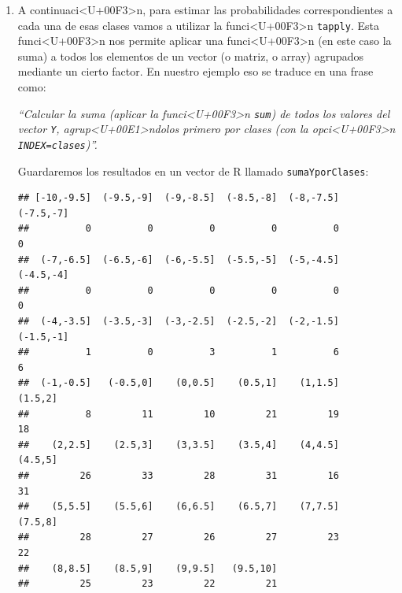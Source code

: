 \documentclass[10pt,a4paper]{article}
\newcounter {cont01}
\begin{document}
\begin{enumerate}
\item A continuaci<U+00F3>n, para estimar las probabilidades correspondientes a cada una de esas clases vamos a utilizar la funci<U+00F3>n {\tt tapply}. Esta funci<U+00F3>n nos permite aplicar una funci<U+00F3>n (en este caso  la suma) a todos los elementos de un vector (o matriz, o array) agrupados mediante un cierto factor. En nuestro ejemplo eso se traduce en una frase como:

{\em
``Calcular la suma (aplicar la funci<U+00F3>n {\tt sum}) de todos los valores del vector {\tt Y}, agrup<U+00E1>ndolos primero por clases (con la opci<U+00F3>n {\tt INDEX=clases})''.
}

Guardaremos los resultados en un vector de R llamado {\tt sumaYporClases}:
\begin{knitrout}
\color{fgcolor}\begin{kframe}
\begin{alltt}
 \hlkwb{=}   
\end{alltt}
\begin{verbatim}
## [-10,-9.5]  (-9.5,-9]  (-9,-8.5]  (-8.5,-8]  (-8,-7.5]  (-7.5,-7] 
##          0          0          0          0          0          0 
##  (-7,-6.5]  (-6.5,-6]  (-6,-5.5]  (-5.5,-5]  (-5,-4.5]  (-4.5,-4] 
##          0          0          0          0          0          0 
##  (-4,-3.5]  (-3.5,-3]  (-3,-2.5]  (-2.5,-2]  (-2,-1.5]  (-1.5,-1] 
##          1          0          3          1          6          6 
##  (-1,-0.5]   (-0.5,0]    (0,0.5]    (0.5,1]    (1,1.5]    (1.5,2] 
##          8         11         10         21         19         18 
##    (2,2.5]    (2.5,3]    (3,3.5]    (3.5,4]    (4,4.5]    (4.5,5] 
##         26         33         28         31         16         31 
##    (5,5.5]    (5.5,6]    (6,6.5]    (6.5,7]    (7,7.5]    (7.5,8] 
##         28         27         26         27         23         22 
##    (8,8.5]    (8.5,9]    (9,9.5]   (9.5,10] 
##         25         23         22         21
\end{verbatim}
\end{kframe}
\end{knitrout}


\end{enumerate}
\end{document}
